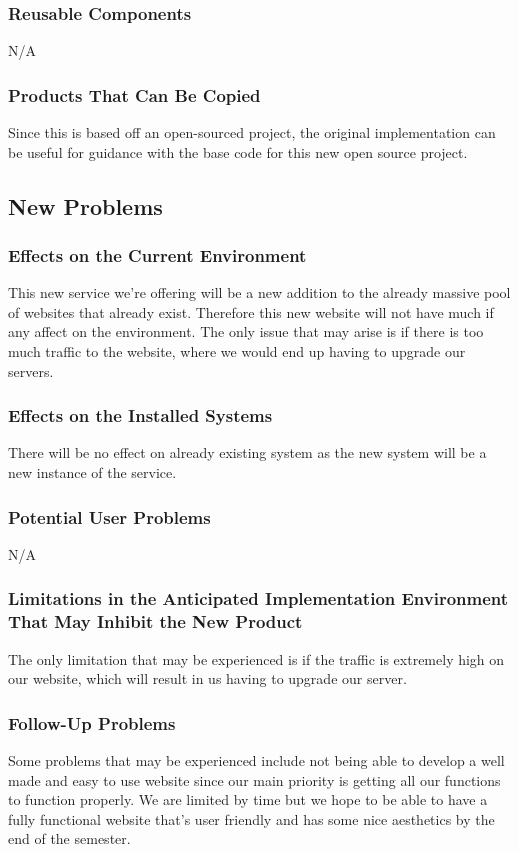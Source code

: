 \documentclass[11pt, oneside]{article}
\begin{document}
\subsubsection{Reusable Components}
N/A


\subsubsection{Products That Can Be Copied}
Since this is based off an open-sourced project, the original implementation can be useful for guidance with the base code for this new open source project.


\subsection{New Problems}
\subsubsection{Effects on the Current Environment}
This new service we’re offering will be a new addition to the already massive pool of websites that already exist. Therefore this new website will not have much if any affect on the environment. The only issue that may arise is if there is too much traffic to the website, where we would end up having to upgrade our servers.
\subsubsection{Effects on the Installed Systems}
There will be no effect on already existing system as the new system will be a new instance of the service.

\subsubsection{Potential User Problems}
N/A

\subsubsection{Limitations in the Anticipated Implementation Environment That May Inhibit the New Product}
The only limitation that may be experienced is if the traffic is extremely high on our website, which will result in us having to upgrade our server.

\subsubsection{Follow-Up Problems}
Some problems that may be experienced include not being able to develop a well made and easy to use website since our main priority is getting all our functions to function properly. We are limited by time but we hope to be able to have a fully functional website that’s user friendly and has some nice aesthetics by the end of the semester.
\end{document}

